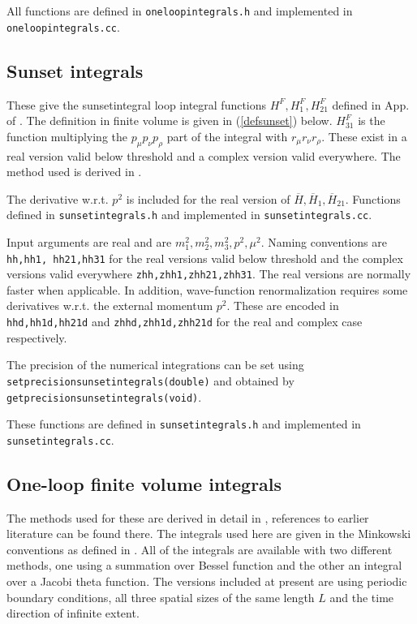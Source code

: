 \documentclass[12pt,a4paper]{article}
\begin{document}
All functions are defined in \texttt{oneloopintegrals.h}
and implemented in\\ \texttt{oneloopintegrals.cc}. 

\subsection{Sunset integrals}
\label{sunset}

These give the sunsetintegral loop integral functions
$H^F,H_{1}^F, H_{21}^F$
defined in App.  of \cite{Amoros:1999dp}.
The definition in finite volume is
given in (\ref{defsunset}) below.
$H_{31}^F$ is the function
multiplying the $p_\mu p_\nu p_\rho$ part of the integral with
$r_\mu r_\nu r_\rho$. These exist in a real version valid below threshold and
a complex version valid everywhere. The method used is derived
in \cite{Amoros:1999dp}. 

The derivative w.r.t. $p^2$ is included for the real version of
$\overline H,\overline H_{1}, \overline H_{21}$. Functions defined
in \texttt{sunsetintegrals.h} and implemented in \texttt{sunsetintegrals.cc}.

Input arguments are real and are $m_1^2, m_2^2,m_3^2,p^2,\mu^2$.
Naming conventions are \texttt{hh,hh1, hh21,hh31} for the real versions valid
below threshold and the complex versions valid
everywhere \texttt{zhh,zhh1,zhh21,zhh31}. The real versions are normally faster
when applicable. In addition, wave-function renormalization requires
some derivatives w.r.t. the external momentum $p^2$.
These are encoded in \texttt{hhd,hh1d,hh21d} and \texttt{zhhd,zhh1d,zhh21d}
for the real and complex case respectively.

The precision of the numerical integrations can be set
using\\ \texttt{setprecisionsunsetintegrals(double)} and
obtained by\\ \texttt{getprecisionsunsetintegrals(void)}.

These functions are defined in \texttt{sunsetintegrals.h}
and implemented in\\ \texttt{sunsetintegrals.cc}.
 
\subsection{One-loop finite volume integrals}

The methods used for these are derived in detail in \cite{Bijnens:2013doa},
references to earlier literature can be found there.
The integrals used here are given in the Minkowski conventions as
defined in \cite{Bijnens:2014dea}.
All of the integrals are available with two different methods, one using
a summation over Bessel function and the other an integral over a
Jacobi theta function. The versions included at present are using
periodic boundary conditions, all three spatial sizes of the same length $L$
and the time direction of infinite extent.
\end{document}
